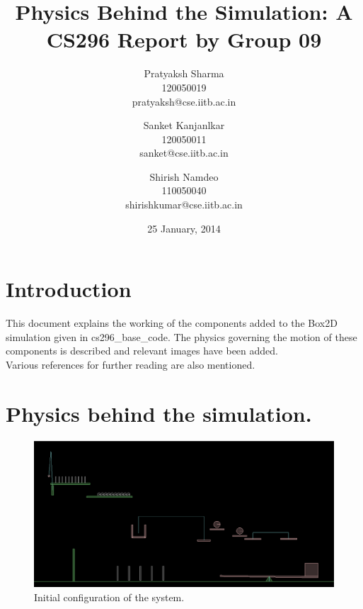 \documentclass[11pt,english]{article}
\author{
  Pratyaksh Sharma\\
  120050019\\
  pratyaksh@cse.iitb.ac.in
  \and
  Sanket Kanjanlkar\\
  120050011\\
  sanket@cse.iitb.ac.in
  \and 
  Shirish Namdeo\\
  110050040\\
  shirishkumar@cse.iitb.ac.in
}
\title{Physics Behind the Simulation: A CS296 Report by Group 09}
\date{25 January, 2014}
\begin{document}
\maketitle

  \section{Introduction}
\indent
\par{This document explains the working of the components added to the Box2D simulation given in cs296\_base\_code. The physics governing the motion of these components is described and relevant images have been added.\\ \indent Various references for further reading are also mentioned.}


\section{Physics behind the simulation.}

\begin{figure}[h!]
  \centering
    \includegraphics[scale=.33]{initial}
    \caption{Initial configuration of the system.}
\end{figure}
\end{document}
